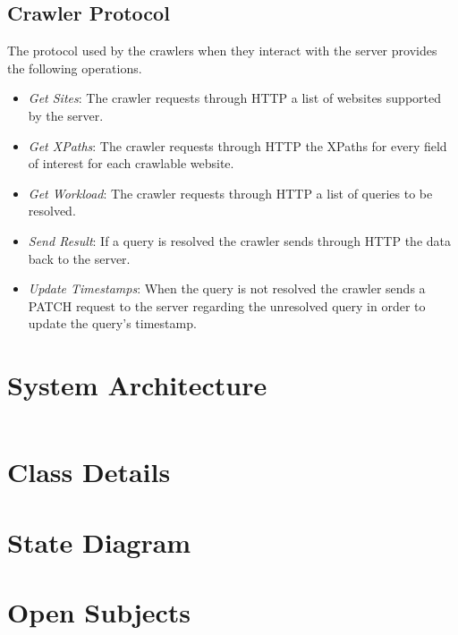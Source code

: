    \section{Crawler Protocol}
        The protocol used by the crawlers when they interact with the server
        provides the following operations. 
        \begin{itemize}
                \item \emph{Get Sites}: The crawler requests through HTTP a
                    list of websites supported by the server.
                \item \emph{Get XPaths}: The crawler requests through HTTP the
                    XPaths for every field of interest for each crawlable
                    website.
                \item \emph{Get Workload}: The crawler requests through HTTP a
                    list of queries to be resolved.
                \item \emph{Send Result}: If a query is resolved the crawler
                    sends through HTTP the data back to the server.
                \item \emph{Update Timestamps}: When the query is not resolved
                    the crawler sends a PATCH request to the server regarding
                    the unresolved query in order to update the query's
                    timestamp.
        \end{itemize}
\chapter{System Architecture}
\inputminted{text}{files/tags}
\chapter{Class Details}
\chapter{State Diagram}
\chapter{Open Subjects}

